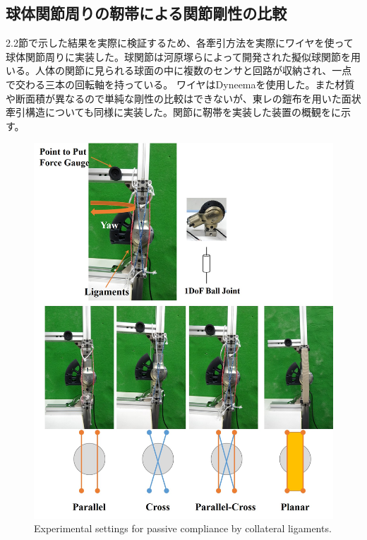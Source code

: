 \documentclass{jarticle}
\begin{document}
\subsection{球体関節周りの靭帯による関節剛性の比較}
2.2節で示した結果を実際に検証するため、各牽引方法を実際にワイヤを使って球体関節周りに実装した。球関節は河原塚らによって開発された擬似球関節\cite{ROBOMECH2018:kawaharaduka:joint}を用いる。人体の関節に見られる球面の中に複数のセンサと回路が収納され、一点で交わる三本の回転軸を持っている。
ワイヤはDyneemaを使用した。また材質や断面積が異なるので単純な剛性の比較はできないが、東レの鎧布を用いた面状牽引構造についても同様に実装した。関節に靭帯を実装した装置の概観をに示す。

\begin{figure}[tb]
 \centering
  \includegraphics[width=1.0\columnwidth]{figs/experimental-setting.jpg}
  \vspace*{-4mm}
  \caption{Experimental settings for passive compliance by collateral ligaments.}
  \label{fig:testbed}
\end{figure}
\end{document}
